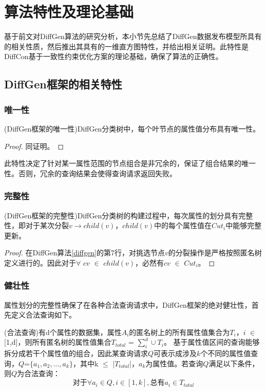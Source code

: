 \section{算法特性及理论基础}

基于前文对DiffGen算法的研究分析，本小节先总结了DiffGen数据发布模型所具有的相关性质，然后推出其具有的一维直方图特性，并给出相关证明。此特性是DiffCon基于一致性约束优化方案的理论基础，确保了算法的正确性。

\subsection{DiffGen框架的相关特性}
\subsubsection{唯一性}
\begin{prop}
	\label{chap4_prop1}
	(DiffGen框架的唯一性)DiffGen分类树中，每个叶节点的属性值分布具有唯一性。
\end{prop}
\begin{proof}
	同\label{prop1}证明。
\end{proof}
此特性决定了针对某一属性范围的节点组合是非冗余的，保证了组合结果的唯一性。否则，冗余的查询结果会使得查询请求返回失败。

\subsubsection{完整性}

\begin{prop}
	\label{chap4_prop2}
	(DiffGen框架的完整性)DiffGen分类树的构建过程中，每次属性的划分具有完整性，即对于某次分裂$v$$\rightarrow$$child(v)$，$child(v)$中的每个属性值在$Cut_{i}$中能够完整更新。
\end{prop}
\begin{proof}
	在DiffGen算法\ref{diffgen}的第7行，对挑选节点$v$的分裂操作是严格按照匿名树定义进行的。因此对于$\forall$ $cv$ $\in$ $child(v)$，必然有$cv$ $\in$ $Cut_{i}$。
\end{proof}

\subsubsection{健壮性}

属性划分的完整性确保了在各种合法查询请求中，DiffGen框架的绝对健壮性，首先定义合法查询如下。

\begin{defn}
	(合法查询)有d个属性的数据集，属性$A_{i}$的匿名树上的所有属性值集合为$T_{i}$，$i$ $\in$ [1,d]，则所有匿名树的属性值集合$T_{total}$ = $\sum\limits_i^d \cup T_{i}$。
	基于属性值区间的查询能够拆分成若干个属性值的组合，因此某查询请求$Q$可表示成涉及$k$个不同的属性值查询，$Q$=$\{a_{1},a_{2},...,a_{k}\}$，其中k $\leqslant$ |$T_{total}$|，$a_{k}$为属性值。若查询$Q$满足以下条件，则$Q$为合法查询：
	\begin{equation}
	\text{对于}\forall a_{i} \in Q, i \in [1,k], \text{总有}a_{i} \in T_{total}
	\end{equation}
	
\end{defn}


